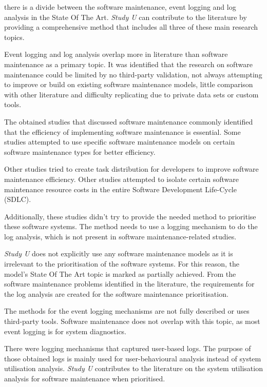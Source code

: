  there is a divide between the software maintenance, event logging and log analysis in the State Of The Art. \textit{Study U} can contribute to the literature by providing a comprehensive method that includes all three of these main research topics. \par Event logging and log analysis overlap more in literature than software maintenance as a primary topic. It was identified that the research on software maintenance could be limited by no third-party validation, not always attempting to improve or build on existing software maintenance models, little comparison with other literature and difficulty replicating due to private data sets or custom tools.\par The obtained studies that discussed software maintenance commonly identified that the efficiency of implementing software maintenance is essential. Some studies attempted to use specific software maintenance models on certain software maintenance types for better efficiency. \par Other studies tried to create task distribution for developers to improve software maintenance efficiency. Other studies attempted to isolate certain software maintenance resource costs in the entire Software Development Life-Cycle (SDLC).\par Additionally, these studies didn't try to provide the needed method to prioritise these software systems. The method needs to use a logging mechanism to do the log analysis, which is not present in software maintenance-related studies.\par \textit{Study U} does not explicitly use any software maintenance models as it is irrelevant to the prioritisation of the software systems. For this reason, the model's State Of The Art topic is marked as partially achieved. From the software maintenance problems identified in the literature, the requirements for the log analysis are created for the software maintenance prioritisation. \par The methods for the event logging mechanisms are not fully described or uses third-party tools. Software maintenance does not overlap with this topic, as most event logging is for system diagnostics.\par There were logging mechanisms that captured user-based logs. The purpose of those obtained logs is mainly used for user-behavioural analysis instead of system utilisation analysis. \textit{Study U} contributes to the literature on the system utilisation analysis for software maintenance when prioritised.

